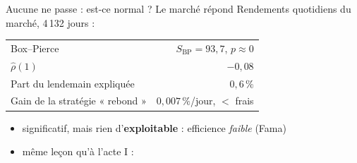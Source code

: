 \documentclass[10pt]{beamer}
\begin{document}
\begin{frame}{Aucune ne passe : est-ce normal ? Le marché répond}
  Rendements quotidiens du marché, 4\,132 jours :
  \vspace{2mm}
  \begin{center}
  \small
  \begin{tabular}{@{}lr@{}}
    \toprule
    Box--Pierce & $S_{\mathrm{BP}} = 93{,}7$, \quad $p \approx 0$ \\
    $\hat\rho(1)$ & $-0{,}08$ \\
    Part du lendemain expliquée & $0{,}6\,\%$ \\
    Gain de la stratégie « rebond » & $0{,}007\,\%$/jour, \alert{$<$ frais} \\
    \bottomrule
  \end{tabular}
  \end{center}
  \vspace{5mm}
  \begin{itemize}\setlength{\itemsep}{4mm}
    \item significatif, mais rien d'\textbf{exploitable} : efficience
      \emph{faible} (Fama)
    \item même leçon qu'à l'acte I : 
  \end{itemize}
\end{frame}
\end{document}
